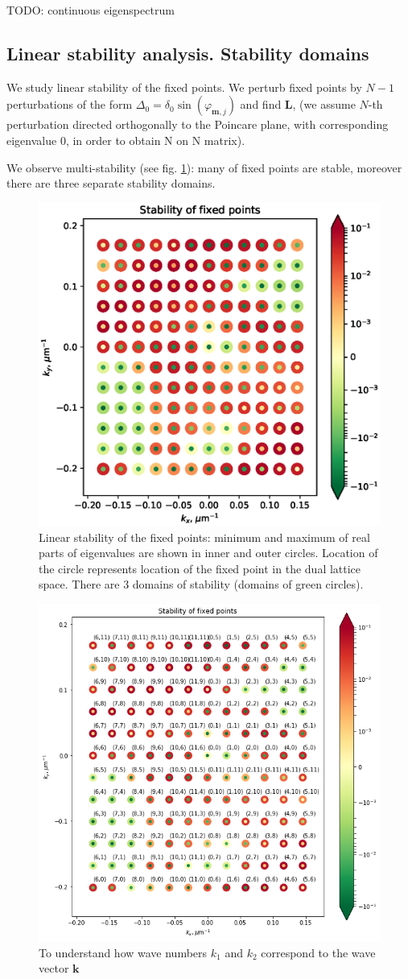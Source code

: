 \documentclass[a4paper,10pt]{article}
\renewcommand*{\vec}[1]{\mathbf{#1}}
\newcommand*{\Lmat}{\mathbf{L}}  %
\begin{document}
TODO: continuous eigenspectrum

\subsection{Linear stability analysis. Stability domains}
We study linear stability of the fixed points. We perturb fixed points by $N-1$ perturbations of the form $\Delta_0 = \delta_0 \sin(\varphi_{\vec{m},j})$ and find $\Lmat$, (we assume $N$-th perturbation directed orthogonally to the Poincare plane, with corresponding eigenvalue $0$, in order to obtain N on N matrix).
 
We observe multi-stability (see fig. \ref{fig:evals-k}): many of fixed points are stable, moreover there are three separate stability domains.

\begin{figure}[h]
    \centering
    \includegraphics[width=.6\textwidth]{assets/theory-2019-09-05-124002319-236.eps}
    \caption{Linear stability of the fixed points: minimum and maximum of real parts of eigenvalues are shown in inner and outer circles. Location of the circle represents location of the fixed point in the dual lattice space. There are 3 domains of stability (domains of green circles).}
    \label{fig:evals-k}
\end{figure}

\begin{figure}[h]
    \centering
    \includegraphics[width=.6\textwidth]{assets/m-twist-map.png}
    \caption{To understand how wave numbers $k_1$ and $k_2$ correspond to the wave vector $\vec{k}$}
\end{figure}
\end{document}

